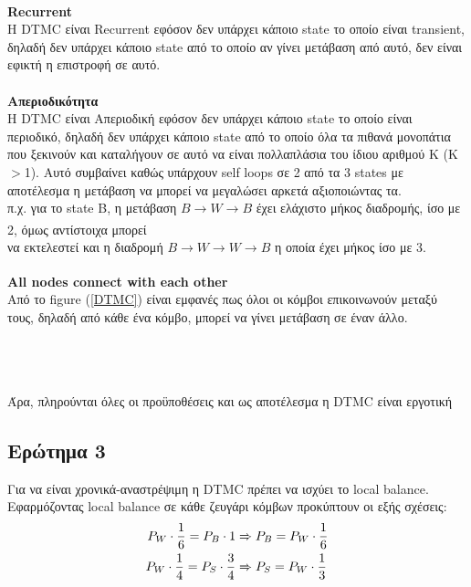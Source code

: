\noindent\\
\textbf{Recurrent}\\
H DTMC είναι Recurrent εφόσον δεν υπάρχει κάποιο state το οποίο είναι transient, δηλαδή δεν υπάρχει κάποιο state από το οποίο αν γίνει μετάβαση από αυτό, δεν είναι εφικτή η επιστροφή σε αυτό.\\

\noindent\\
\textbf{Απεριοδικότητα}\\
Η DTMC είναι Απεριοδική εφόσον δεν υπάρχει κάποιο state το οποίο είναι περιοδικό, δηλαδή δεν υπάρχει κάποιο state από το οποίο όλα τα πιθανά μονοπάτια που ξεκινούν και καταλήγουν σε αυτό να είναι πολλαπλάσια του ίδιου αριθμού Κ (Κ$>$1). Αυτό συμβαίνει καθώς υπάρχουν self loops σε 2 από τα 3 states με αποτέλεσμα η μετάβαση να μπορεί να μεγαλώσει αρκετά αξιοποιώντας τα.\\

\noindent
π.χ. για το state Β, η μετάβαση $B \xrightarrow[]{} W \xrightarrow[]{} B$ έχει ελάχιστο μήκος διαδρομής, ίσο με 2, όμως αντίστοιχα μπορεί\\ \vspace{1cm} \qquad να εκτελεστεί και η διαδρομή $B \xrightarrow[]{} W \xrightarrow[]{} W \xrightarrow[]{} B$ η οποία έχει μήκος ίσο με 3.

\noindent
\textbf{All nodes connect with each other}\\
Από το figure (\ref{DTMC}) είναι εμφανές πως όλοι οι κόμβοι επικοινωνούν μεταξύ τους, δηλαδή από κάθε ένα κόμβο, μπορεί να γίνει μετάβαση σε έναν άλλο.


\noindent\\\\\\
Άρα, πληρούνται όλες οι προϋποθέσεις και ως αποτέλεσμα η DTMC είναι εργοτική

\clearpage
\subsection*{Ερώτημα 3}
\label{ex2q3}

Για να είναι χρονικά-αναστρέψιμη η DTMC πρέπει να ισχύει το local balance. Εφαρμόζοντας local balance σε κάθε ζευγάρι κόμβων προκύπτουν οι εξής σχέσεις:
\begin{align}
	P_W \cdot \frac{1}{6} = P_B \cdot 1 &\xRightarrow{} P_B = P_W \cdot \frac{1}{6} \label{pbw}\\
	P_W \cdot \frac{1}{4} = P_S \cdot \frac{3}{4} &\xRightarrow{} P_S = P_W \cdot \frac{1}{3} \label{psw}
\end{align}

